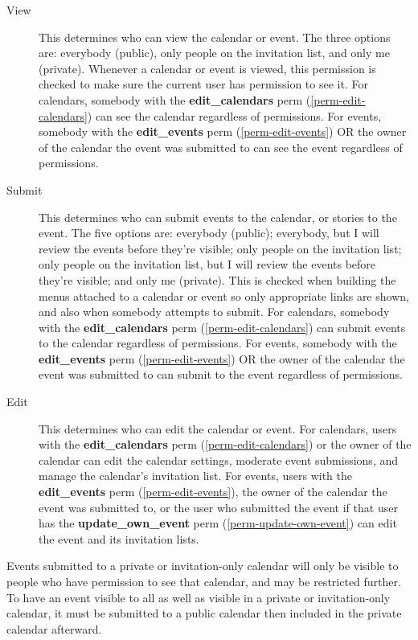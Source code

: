 \begin{description}
\item[View] This determines who can view the calendar or event. The three options are: everybody (public), only people on the invitation list, and only me (private). Whenever a calendar or event is viewed, this permission is checked to make sure the current user has permission to see it. For calendars, somebody with the {\bf edit\_calendars} perm (\ref{perm-edit-calendars}) can see the calendar regardless of permissions. For events, somebody with the {\bf edit\_events} perm (\ref{perm-edit-events}) OR the owner of the calendar the event was submitted to can see the event regardless of permissions.
\item[Submit] This determines who can submit events to the calendar, or stories to the event. The five options are: everybody (public); everybody, but I will review the events before they're visible; only people on the invitation list; only people on the invitation list, but I will review the events before they're visible; and only me (private). This is checked when building the menus attached to a calendar or event so only appropriate links are shown, and also when somebody attempts to submit. For calendars, somebody with the {\bf edit\_calendars} perm (\ref{perm-edit-calendars}) can submit events to the calendar regardless of permissions. For events, somebody with the {\bf edit\_events} perm (\ref{perm-edit-events}) OR the owner of the calendar the event was submitted to can submit to the event regardless of permissions.
\item[Edit] This determines who can edit the calendar or event. For calendars, users with the {\bf edit\_calendars} perm (\ref{perm-edit-calendars}) or the owner of the calendar can edit the calendar settings, moderate event submissions, and manage the calendar's invitation list. For events, users with the {\bf edit\_events} perm (\ref{perm-edit-events}), the owner of the calendar the event was submitted to, or the user who submitted the event if that user has the {\bf update\_own\_event} perm (\ref{perm-update-own-event}) can edit the event and its invitation lists.
\end{description}

Events submitted to a private or invitation-only calendar will only be visible to people who have permission to see that calendar, and may be restricted further. To have an event visible to all as well as visible in a private or invitation-only calendar, it must be submitted to a public calendar then included in the private calendar afterward.

